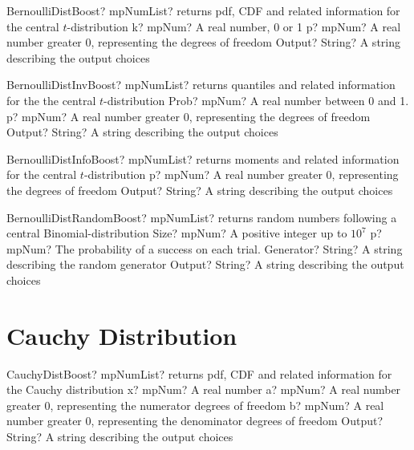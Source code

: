 \documentclass[12pt,a4paper,openany]{book}
\begin{document}
\begin{mpFunctionsExtract}
\mpFunctionThree
{BernoulliDistBoost? mpNumList? returns pdf, CDF and related information for the central $t$-distribution}
{k? mpNum? A real number, 0 or 1}
{p? mpNum? A real number greater 0, representing the degrees of freedom}
{Output? String? A string describing the output choices}
\end{mpFunctionsExtract}

\begin{mpFunctionsExtract}
\mpFunctionThree
{BernoulliDistInvBoost? mpNumList? returns quantiles and related information for the the central $t$-distribution}
{Prob? mpNum? A real number between 0 and 1.}
{p? mpNum? A real number greater 0, representing the degrees of freedom}
{Output? String? A string describing the output choices}
\end{mpFunctionsExtract}

\begin{mpFunctionsExtract}
\mpFunctionTwo
{BernoulliDistInfoBoost? mpNumList? returns moments and related information for the central $t$-distribution}
{p? mpNum? A real number greater 0, representing the degrees of freedom}
{Output? String? A string describing the output choices}
\end{mpFunctionsExtract}

\begin{mpFunctionsExtract}
\mpFunctionFour
{BernoulliDistRandomBoost? mpNumList? returns random numbers following a central Binomial-distribution}
{Size? mpNum? A positive integer up to $10^7$}
{p? mpNum? The probability of a success on each trial.}
{Generator? String? A string describing the random generator}
{Output? String? A string describing the output choices}
\end{mpFunctionsExtract}

\section{Cauchy Distribution}

\begin{mpFunctionsExtract}
\mpFunctionFour
{CauchyDistBoost? mpNumList? returns pdf, CDF and related information for the Cauchy distribution}
{x? mpNum? A real number}
{a? mpNum? A real number greater 0, representing the numerator  degrees of freedom}
{b? mpNum? A real number greater 0, representing the denominator degrees of freedom}
{Output? String? A string describing the output choices}
\end{mpFunctionsExtract}
\end{document}
